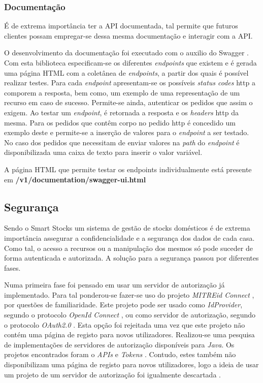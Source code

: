 \subsubsection{Documentação}

É de extrema importância ter a API documentada, tal permite que futuros clientes possam empregar-se dessa mesma documentação e interagir com a API.

O desenvolvimento da documentação foi executado com o auxilio do Swagger \cite{Swagger:api}. Com esta biblioteca especificam-se os diferentes \textit{endpoints} que existem e é gerada uma página HTML com a coletânea de \textit{endpoints}, a partir dos quais é possível realizar testes. Para cada \textit{endpoint} apresentam-se os possíveis \textit{status codes} \acrshort{http} a comporem a resposta, bem como, um exemplo de uma representação de um recurso em caso de sucesso. Permite-se ainda, autenticar os pedidos que assim o exigem. Ao testar um \textit{endpoint}, é retornada a resposta e os \textit{headers} \acrshort{http} da mesma. Para os pedidos que contêm corpo no pedido \acrshort{http} é concedido um exemplo deste e permite-se a inserção de valores para o \textit{endpoint} a ser testado. No caso dos pedidos que necessitam de enviar valores na \textit{path} do \textit{endpoint} é disponibilizada uma caixa de texto para inserir o valor variável. 

A página HTML que permite testar os endpoints individualmente está presente em \textbf{/v1/documentation/swagger-ui.html}


%
%
\subsection{Segurança}\label{subsec334}

Sendo o Smart Stocks um sistema de gestão de stocks domésticos é de extrema importância assegurar a confidencialidade e a segurança dos dados de cada casa. Como tal, o acesso a recursos ou a manipulação dos mesmos só pode suceder de forma autenticada e autorizada. A solução para a segurança passou por diferentes fases.

Numa primeira fase foi pensado em usar um servidor de autorização já implementado. Para tal ponderou-se fazer-se uso do projeto \textit{MITREid Connect} \cite{mitreidconnect:impl}, por questões de familiaridade. Este projeto pode ser usado como \textit{IdProvider}, segundo o protocolo \textit{OpenId Connect} \cite{OpenIDConnect:introduction}, ou como servidor de autorização, segundo o protocolo \textit{OAuth2.0} \cite{OAuth20:introduction}. Esta opção foi rejeitada uma vez que este projeto não contém uma página de registo para novos utilizadores. Realizou-se uma pesquisa de implementações de servidores de autorização disponíveis para \textit{Java}. Os projetos encontrados foram o \textit{APIs} \cite{OAuthApis:impl} e \textit{Tokens} \cite{tokens:impl}. Contudo, estes também não disponibilizam uma página de registo para novos utilizadores, logo a ideia de usar um projeto de um servidor de autorização foi igualmente descartada . 

